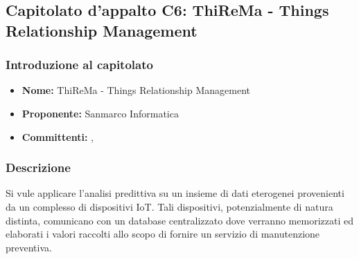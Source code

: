 \subsection{Capitolato d'appalto C6: ThiReMa - Things Relationship Management}
	\subsubsection{Introduzione al capitolato}
	\begin{itemize}
		\item \textbf{Nome:} ThiReMa - Things Relationship Management
		\item \textbf{Proponente:} Sanmarco Informatica
		\item \textbf{Committenti:} \TV, \RC
	\end{itemize}
	\subsubsection{Descrizione}
	Si vule applicare l'analisi predittiva su un insieme di dati eterogenei provenienti da un complesso di dispositivi IoT. Tali dispositivi, potenzialmente di natura distinta, comunicano con un database centralizzato dove verranno memorizzati ed elaborati i valori raccolti allo scopo di fornire un servizio di manutenzione preventiva.  
